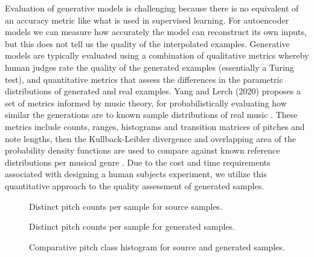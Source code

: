 \documentclass[sigconf,authorversion]{acmart}
\begin{document}
Evaluation of generative models is challenging because there is no
equivalent of an accuracy metric like what is used in supervised
learning. For autoencoder models we can measure how accurately the
model can reconstruct its own inputs, but this does not tell us the
quality of the interpolated examples. Generative models are typically
evaluated using a combination of qualitative metrics whereby human
judges rate the quality of the generated examples (essentially a
Turing test), and quantitative metrics that assess the differences in
the parametric distributions of generated and real examples. Yang and
Lerch (2020) proposes a set of metrics informed by music theory, for
probabilistically evaluating how similar the generations are to known
sample distributions of real music \cite{yang_evaluation_2020}. These
metrics include counts, ranges, histograms and transition matrices of
pitches and note lengths, then the Kullback-Leibler divergence and
overlapping area of the probability density functions are used to
compare against known reference distributions per musical genre
\cite{yang_evaluation_2020}. Due to the cost and time requirements
associated with designing a human subjects experiment, we
utilize this quantitative approach to the quality assessment of
generated samples.

\begin{figure}[htbp]
    \begin{center}
        \scalebox{0.6}{}
    \end{center}
    \caption{Distinct pitch counts per sample for source samples.}
    \label{source_pitches}
\end{figure}

\begin{figure}[htbp]
    \begin{center}
        \scalebox{0.6}{}
    \end{center}
    \caption{Distinct pitch counts per sample for generated samples.}
    \label{generated_pitches}
\end{figure}

\begin{figure}[htbp]
    \begin{center}
        \scalebox{0.6}{}
    \end{center}
    \caption{Comparative pitch class histogram for source and generated samples.}
    \label{pch}
\end{figure}
\end{document}
